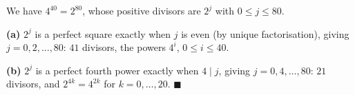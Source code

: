 We have $4^{40}=2^{80}$, whose positive divisors are $2^j$ with $0\le j\le80$.

\textbf{(a)} $2^j$ is a perfect square exactly when $j$ is even (by unique factorisation), giving $j=0,2,\dots,80$: $\boxed{41}$ divisors, the powers $4^i$, $0\le i\le40$.

\textbf{(b)} $2^j$ is a perfect fourth power exactly when $4\mid j$, giving $j=0,4,\dots,80$: $\boxed{21}$ divisors, and $2^{4k}=4^{2k}$ for $k=0,\dots,20$. $\blacksquare$
